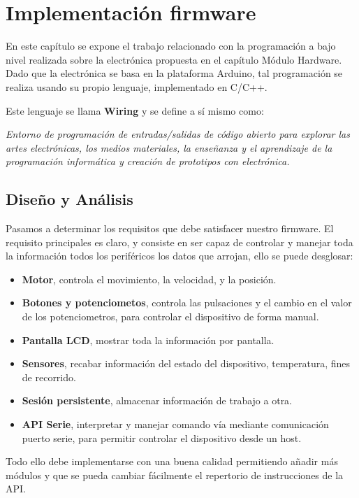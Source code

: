 \section{Implementación firmware}

En este capítulo se expone el trabajo relacionado con la programación a bajo nivel realizada sobre la electrónica propuesta en el capítulo Módulo Hardware.
Dado que la electrónica se basa en la plataforma Arduino, tal programación se realiza usando su propio lenguaje,  implementado en C/C++.

Este lenguaje se llama \textbf{Wiring} y se define a sí mismo como:

\textit{Entorno de programación de entradas/salidas de código abierto para explorar las artes electrónicas, los medios materiales, la enseñanza y el aprendizaje de la programación informática y creación de prototipos con electrónica.
}


\subsection{Diseño y Análisis}

Pasamos a determinar los requisitos que debe satisfacer nuestro firmware.
El requisito principales es claro, y consiste en ser capaz de controlar y manejar toda la información todos los periféricos  los datos que arrojan, ello se puede desglosar:

\begin{itemize}
	\item \textbf{Motor}, controla el movimiento, la velocidad, y la posición. 
	\item \textbf{Botones y potenciometos}, controla las pulsaciones y el cambio en el valor de los potenciometros, para controlar el dispositivo de forma manual. 
	\item \textbf{Pantalla LCD}, mostrar toda la información por pantalla.
	\item \textbf{Sensores}, recabar información del estado del dispositivo, temperatura, fines de recorrido.
	\item \textbf{Sesión persistente}, almacenar información de trabajo a otra.
	\item \textbf{API Serie}, interpretar y manejar comando vía mediante comunicación puerto serie, para permitir controlar el dispositivo desde un host.
\end{itemize}

Todo ello debe implementarse con una buena calidad permitiendo añadir más módulos y que se pueda cambiar fácilmente el repertorio de instrucciones de la API.

